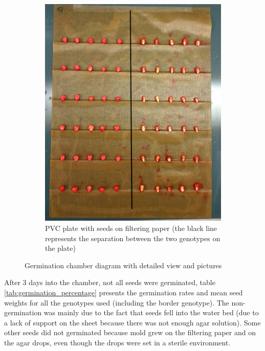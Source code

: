 \begin{figure}[!htb]
\begin{subfigure}[b]{0.475\textwidth}
            \label{fig:germiantion_ledge}
        \end{subfigure}
        \quad
        \begin{subfigure}[b]{0.475\textwidth}   
            \centering 
            \includegraphics[width=\textwidth]{figures/photo_germination_plate.jpg}
            \caption[]%
            {PVC plate with seeds on filtering paper (the black line represents the separation between the two genotypes on the plate)}    
            \label{fig:photo_germination_plate}
        \end{subfigure}
        \caption{Germination chamber diagram with detailed view and pictures}
    \end{figure}

After 3 days into the chamber, not all seeds were germinated, table \ref{tab:germination_percentage} presents the germination rates and mean seed weights for all the genotypes used (including the border genotype). The non-germination was mainly due to the fact that seeds fell into the water bed (due to a lack of support on the sheet because there was not enough agar solution). Some other seeds did not germinated because mold grew on the filtering paper and on the agar drops, even though the drops were set in a sterile environment.

